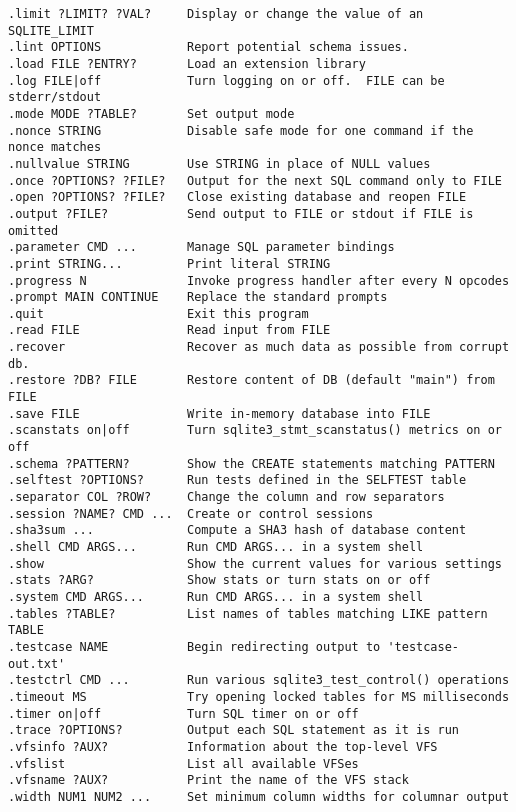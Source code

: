 \begin{verbatim}
.limit ?LIMIT? ?VAL?     Display or change the value of an SQLITE_LIMIT
.lint OPTIONS            Report potential schema issues.
.load FILE ?ENTRY?       Load an extension library
.log FILE|off            Turn logging on or off.  FILE can be stderr/stdout
.mode MODE ?TABLE?       Set output mode
.nonce STRING            Disable safe mode for one command if the nonce matches
.nullvalue STRING        Use STRING in place of NULL values
.once ?OPTIONS? ?FILE?   Output for the next SQL command only to FILE
.open ?OPTIONS? ?FILE?   Close existing database and reopen FILE
.output ?FILE?           Send output to FILE or stdout if FILE is omitted
.parameter CMD ...       Manage SQL parameter bindings
.print STRING...         Print literal STRING
.progress N              Invoke progress handler after every N opcodes
.prompt MAIN CONTINUE    Replace the standard prompts
.quit                    Exit this program
.read FILE               Read input from FILE
.recover                 Recover as much data as possible from corrupt db.
.restore ?DB? FILE       Restore content of DB (default "main") from FILE
.save FILE               Write in-memory database into FILE
.scanstats on|off        Turn sqlite3_stmt_scanstatus() metrics on or off
.schema ?PATTERN?        Show the CREATE statements matching PATTERN
.selftest ?OPTIONS?      Run tests defined in the SELFTEST table
.separator COL ?ROW?     Change the column and row separators
.session ?NAME? CMD ...  Create or control sessions
.sha3sum ...             Compute a SHA3 hash of database content
.shell CMD ARGS...       Run CMD ARGS... in a system shell
.show                    Show the current values for various settings
.stats ?ARG?             Show stats or turn stats on or off
.system CMD ARGS...      Run CMD ARGS... in a system shell
.tables ?TABLE?          List names of tables matching LIKE pattern TABLE
.testcase NAME           Begin redirecting output to 'testcase-out.txt'
.testctrl CMD ...        Run various sqlite3_test_control() operations
.timeout MS              Try opening locked tables for MS milliseconds
.timer on|off            Turn SQL timer on or off
.trace ?OPTIONS?         Output each SQL statement as it is run
.vfsinfo ?AUX?           Information about the top-level VFS
.vfslist                 List all available VFSes
.vfsname ?AUX?           Print the name of the VFS stack
.width NUM1 NUM2 ...     Set minimum column widths for columnar output
\end{verbatim}
\endgroup
